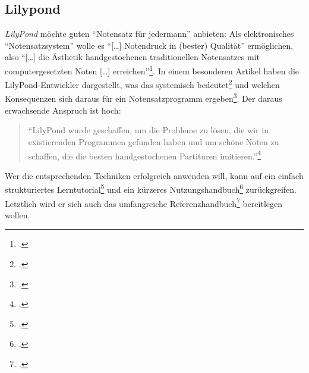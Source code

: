 %
%
%



\subsection{Lilypond}

\emph{LilyPond} möchte guten \enquote{Notensatz für jedermann} anbieten: Als
elektronisches \enquote{Notensatzsystem} wolle es \enquote{[\ldots] Notendruck
in (bester) Qualität} ermöglichen, also \enquote{[\ldots] die Ästhetik
handgestochenen traditionellen Notensatzes mit computergesetzten Noten [\ldots]
erreichen}\footcite[vgl.][\nopage wp]{LilyPond2018a}. In einem besonderen
Artikel haben die LilyPond-Entwickler dargestellt, was das systemisch
bedeutet\footcite[vgl.][5ff]{LilyPond2018d} und welchen Konsequenzen sich daraus
für ein Notensatzprogramm ergeben\footcite[vgl.][8ff]{LilyPond2018d}. Der daraus
erwachsende Anspruch ist hoch:

\begin{quote}\begin{em}
  \enquote{LilyPond wurde geschaffen, um die Probleme zu lösen, die wir in
  existierenden Programmen gefunden haben und um schöne Noten zu schaffen, die
  die besten handgestochenen Partituren imitieren.}\footcite[vgl.][2]{LilyPond2018d}
\end{em}\end{quote}

Wer die entsprechenden Techniken erfolgreich anwenden will, kann auf ein einfach
strukturiertes Lerntutorial\footcite[vgl.][20ff]{LilyPond2018b} und ein kürzeres
Nutzungshandbuch\footcite[vgl.][1ff]{LilyPond2018e} zurückgreifen. Letztlich
wird er sich auch das umfangreiche
Referenzhandbuch\footcite[vgl.][1ff]{LilyPond2018c} bereitlegen wollen.

